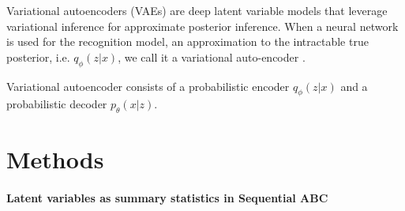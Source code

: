 \documentclass[12pt]{article} %
\newcommand{\para}[1]{\vspace*{-4.5mm}\paragraph{#1}}
\begin{document}
Variational autoencoders (VAEs) are deep latent variable models that leverage variational inference for approximate posterior inference. When a neural network is used for the recognition model, an approximation to the intractable true posterior, i.e. $q_{\phi}(z|x)$, we call it a variational auto-encoder \citep{kingma2013auto}. 

Variational autoencoder consists of a probabilistic encoder $q_{\phi}(z|x)$ and a probabilistic decoder $p_{\theta}(x|z)$. 







\section*{Methods}

\vspace{3mm}
\para{Latent variables as summary statistics in Sequential ABC}
\end{document}
